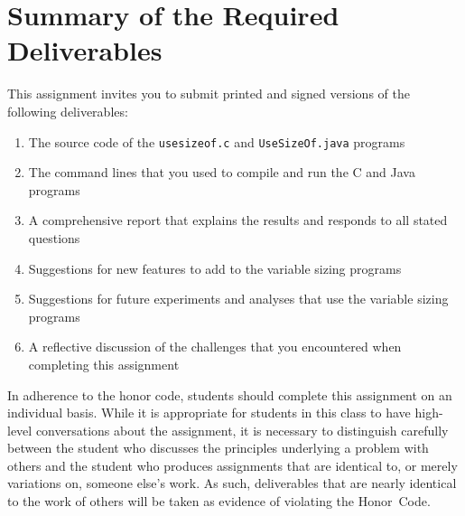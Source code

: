 \section*{Summary of the Required Deliverables}

This assignment invites you to submit printed and signed versions of the following deliverables: 

\begin{enumerate}

  \item The source code of the {\tt usesizeof.c} and {\tt UseSizeOf.java} programs

  \item The command lines that you used to compile and run the C and Java programs

  \item A comprehensive report that explains the results and responds to all stated questions 

  \item Suggestions for new features to add to the variable sizing programs

  \item Suggestions for future experiments and analyses that use the variable sizing programs

  \item A reflective discussion of the challenges that you encountered when completing this assignment

\end{enumerate}

In adherence to the honor code, students should complete this assignment on an individual basis. While it is appropriate
for students in this class to have high-level conversations about the assignment, it is necessary to distinguish
carefully between the student who discusses the principles underlying a problem with others and the student who produces
assignments that are identical to, or merely variations on, someone else's work.  As such, deliverables that are nearly
identical to the work of others will be taken as evidence of violating the \mbox{Honor Code}.  

  
